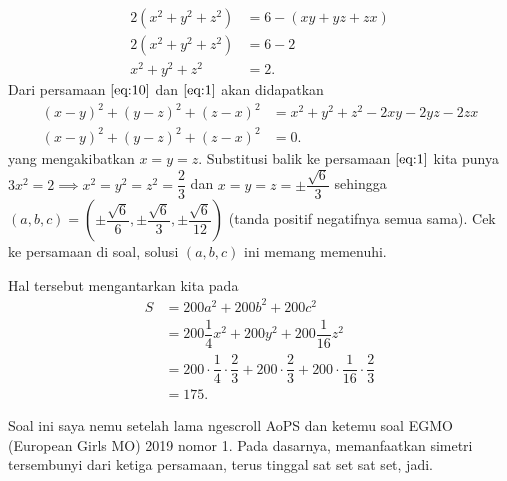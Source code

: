\documentclass[12pt]{scrartcl}
\begin{document}
\begin{jawaban}
\begin{align}
    2(x^2+y^2+z^2) &= 6 - (xy+yz+zx) \nonumber\\
    2(x^2+y^2+z^2) &= 6 - 2 \nonumber\\
    x^2+y^2+z^2 &= 2. \label{eq:10}
\end{align}
Dari persamaan $\eqref{eq:10}$ dan $\eqref{eq:1}$ akan didapatkan
\begin{align}
    (x-y)^2+(y-z)^2+(z-x)^2 &= x^2 + y^2 + z^2 - 2xy -2yz -2zx \nonumber\\
    (x-y)^2+(y-z)^2+(z-x)^2 &= 0. \label{eq:11}
\end{align}
yang mengakibatkan $x=y=z$. Substitusi balik ke persamaan $\eqref{eq:1}$ kita punya
$3x^2=2 \implies x^2 = y^2 = z^2 = \dfrac{2}{3}$ dan $x=y=z=\pm\dfrac{\sqrt{6}}{3}$ sehingga\\ $(a,b,c)=\left(\pm\dfrac{\sqrt{6}}{6},\pm\dfrac{\sqrt{6}}{3},\pm\dfrac{\sqrt{6}}{12}\right)$ (tanda positif negatifnya semua sama). Cek ke persamaan di soal, solusi $(a,b,c)$ ini memang memenuhi.

Hal tersebut mengantarkan kita pada 
\begin{align*}
    S &= 200a^2+200b^2+200c^2\\
     &= 200\dfrac{1}{4}x^2+200y^2+200\dfrac{1}{16}z^2\\
      &= 200\cdot \dfrac{1}{4} \cdot \dfrac{2}{3} + 200\cdot\dfrac{2}{3} + 200\cdot\dfrac{1}{16} \cdot \dfrac{2}{3}\\
      &= \boxed{175}.
\end{align*}

\end{jawaban}
\begin{remark}
Soal ini saya nemu setelah lama ngescroll AoPS dan ketemu soal EGMO (European Girls MO) 2019 nomor 1. Pada dasarnya, memanfaatkan simetri tersembunyi dari ketiga persamaan, terus tinggal sat set sat set, jadi.
\end{remark}
\end{document}
